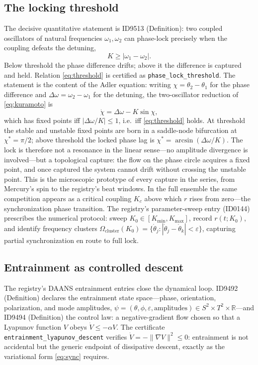 \documentclass[11pt]{article}
\theoremstyle{remark}
\begin{document}
\subsection{The locking threshold}

The decisive quantitative statement is ID9513 (Definition): two coupled oscillators of natural frequencies $\omega_1, \omega_2$ can phase-lock precisely when the coupling defeats the detuning,
\begin{equation}
K \geq |\omega_1 - \omega_2|.
\label{eq:threshold}
\end{equation}
Below threshold the phase difference drifts; above it the difference is captured and held. Relation \eqref{eq:threshold} is certified as \texttt{phase\_lock\_threshold}. The statement is the content of the Adler equation: writing $\chi = \theta_2 - \theta_1$ for the phase difference and $\Delta\omega = \omega_2 - \omega_1$ for the detuning, the two-oscillator reduction of \eqref{eq:kuramoto} is
\begin{equation}
\dot{\chi} = \Delta\omega - K\sin\chi,
\label{eq:adler}
\end{equation}
which has fixed points iff $|\Delta\omega/K| \leq 1$, i.e.\ iff \eqref{eq:threshold} holds. At threshold the stable and unstable fixed points are born in a saddle-node bifurcation at $\chi^\ast = \pi/2$; above threshold the locked phase lag is $\chi^\ast = \arcsin(\Delta\omega/K)$. The lock is therefore not a resonance in the linear sense---no amplitude divergence is involved---but a topological capture: the flow on the phase circle acquires a fixed point, and once captured the system cannot drift without crossing the unstable point. This is the microscopic prototype of every capture in the series, from Mercury's spin to the registry's beat windows. In the full ensemble the same competition appears as a critical coupling $K_c$ above which $r$ rises from zero---the synchronization phase transition. The registry's parameter-sweep entry (ID0144) prescribes the numerical protocol: sweep $K_0 \in [K_{\min}, K_{\max}]$, record $r(t; K_0)$, and identify frequency clusters $\Omega_{\mathrm{cluster}}(K_0) = \{\dot{\theta}_j : |\dot{\theta}_j - \dot{\theta}_k| < \varepsilon\}$, capturing partial synchronization en route to full lock.

\subsection{Entrainment as controlled descent}

The registry's DAANS entrainment entries close the dynamical loop. ID9492 (Definition) declares the entrainment state space---phase, orientation, polarization, and mode amplitudes, $\psi = (\theta, \phi, \varepsilon, \text{amplitudes}) \in S^2 \times T^2 \times \mathbb{R}$---and ID9494 (Definition) the control law: a negative-gradient flow chosen so that a Lyapunov function $V$ obeys $\dot{V} \leq -\alpha V$. The certificate \texttt{entrainment\_lyapunov\_descent} verifies $\dot{V} = -\|\nabla V\|^2 \leq 0$: entrainment is not accidental but the generic endpoint of dissipative descent, exactly as the variational form \eqref{eq:sync} requires.
\end{document}

